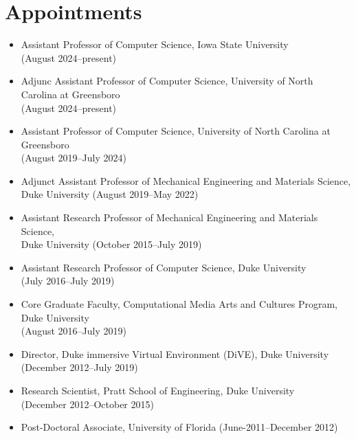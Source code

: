 \documentclass[wideaddress]{vitae}
\author{Regis Kopper}
\let\olditem\item
\def\item{\nopagebreak[4]\olditem}%
\begin{document}
\maketitle


\section{Appointments}
\begin{itemize}
	\item{Assistant Professor of Computer Science, Iowa State University\\(August 2024--present)}
	\item{Adjunc Assistant Professor of Computer Science, University of North Carolina at Greensboro\\(August 2024--present)}
    \item{Assistant Professor of Computer Science, University of North Carolina at Greensboro\\(August 2019--July 2024)}
	\item{Adjunct Assistant Professor of Mechanical Engineering and Materials Science,\\Duke University (August 2019--May 2022)}
	\item{Assistant Research Professor of Mechanical Engineering and Materials Science,\\Duke University (October 2015--July 2019)}
	\item{Assistant Research Professor of Computer Science, Duke University\\(July 2016--July 2019)}
	\item{Core Graduate Faculty, Computational Media Arts and Cultures Program, Duke University\\(August 2016--July 2019)}
	\item{Director, Duke immersive Virtual Environment (DiVE), Duke University\\(December 2012--July 2019)}
	\item{Research Scientist, Pratt School of Engineering, Duke University\\(December 2012--October 2015)}
	\item{Post-Doctoral Associate, University of Florida (June-2011--December 2012)}
\end{itemize}
\end{document}
